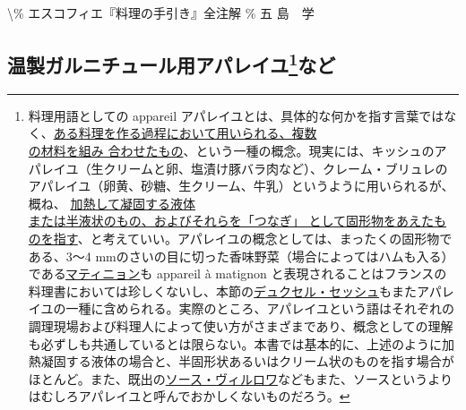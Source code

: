 \textbackslash{}\% エスコフィエ『料理の手引き』全注解 \% 五 島　学

\href{未、原文対照チェック}{} \href{未、日本語表現校正}{}
\href{未、その他修正}{} \href{未、原稿最終校正}{}

\begin{Main}

\hypertarget{serie-des-appareiles-et-preparations-diverses-pour-garnitures-chaudes}{%
\section[温製ガルニチュール用アパレイユなど]{\texorpdfstring{温製ガルニチュール用アパレイユ\footnote{料理用語としての
  appareil
  アパレイユとは、具体的な何かを指す言葉ではなく、\ul{ある料理を作る過程において用いられる、複数\\の材料を組み
  合わせたもの}、という一種の概念。現実には、キッシュのアパレイユ（生クリームと卵、塩漬け豚バラ肉など）、クレーム・ブリュレのアパレイユ（卵黄、砂糖、生クリーム、牛乳）というように用いられるが、概ね、
  \ul{加熱して凝固する液体\\または半液状のもの、およびそれらを「つなぎ」
  として固形物をあえたものを指す}、と考えていい。アパレイユの概念としては、まったくの固形物である、3〜4
  mmのさいの目に切った香味野菜（場合によってはハムも入る）である\protect\hyperlink{matignon}{マティニョン}も
  appareil à matignon
  と表現されることはフランスの料理書においては珍しくないし、本節の\protect\hyperlink{duxelles-seche}{デュクセル・セッシュ}もまたアパレイユの一種に含められる。実際のところ、アパレイユという語はそれぞれの調理現場および料理人によって使い方がさまざまであり、概念としての理解も必ずしも共通しているとは限らない。本書では基本的に、上述のように加熱凝固する液体の場合と、半固形状あるいはクリーム状のものを指す場合がほとんど。また、既出の\protect\hyperlink{sauce-villeroy}{ソース・ヴィルロワ}などもまた、ソースというよりはむしろアパレイユと呼んでおかしくないものだろう。}など}{温製ガルニチュール用アパレイユなど}}\label{serie-des-appareiles-et-preparations-diverses-pour-garnitures-chaudes}}



\end{Main}

